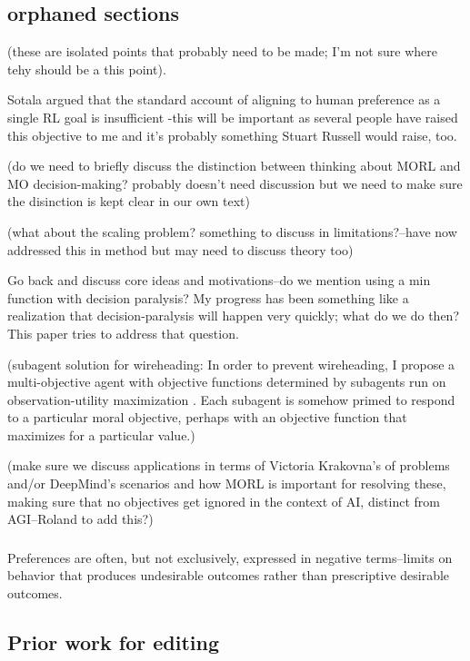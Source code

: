 \subsection{orphaned sections}

(these are isolated points that probably need to be made; I'm not sure where tehy should be a this point).

Sotala argued that the standard account of aligning to human preference as a single RL goal is insufficient \cite{sotala2016defining} -this will be important as several people have raised this objective to me and it's probably something Stuart Russell would raise, too.

(do we need to briefly discuss the distinction between thinking about MORL and MO decision-making? probably doesn't need discussion but we need to make sure the disinction is kept clear in our own text)

(what about the scaling problem? something to discuss in limitations?--have now addressed this in method but may need to discuss theory too)

Go back and discuss core ideas and motivations--do we mention using a min function with decision paralysis? My progress has been something like a realization that decision-paralysis will happen very quickly; what do we do then? This paper tries to address that question.

(subagent solution for wireheading: In order to prevent wireheading, I propose a multi-objective agent with objective functions determined by subagents run on observation-utility maximization \cite{dewey_learning_2011}. Each subagent is somehow primed to respond to a particular moral objective, perhaps with an objective function that maximizes for a particular value.)


(make sure we discuss applications in terms of Victoria Krakovna's of problems and/or DeepMind's scenarios and how MORL is important for resolving these, making sure that no objectives get ignored in the context of AI, distinct from AGI--Roland to add this?)

\subsubsection{}
Preferences are often, but not exclusively, expressed in negative terms--limits on behavior that produces undesirable outcomes rather than prescriptive desirable outcomes. 

\subsection{Prior work for editing}


